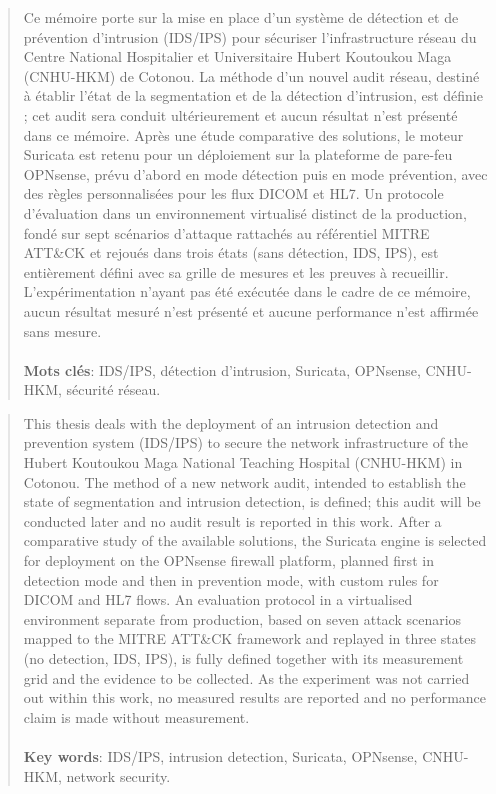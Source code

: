 \resume
{}
\vspace*{-6cm}
\begin{abstract}
Ce mémoire porte sur la mise en place d'un système de détection et de prévention d'intrusion (IDS/IPS) pour sécuriser l'infrastructure réseau du Centre National Hospitalier et Universitaire Hubert Koutoukou Maga (CNHU-HKM) de Cotonou. La méthode d'un nouvel audit réseau, destiné à établir l'état de la segmentation et de la détection d'intrusion, est définie ; cet audit sera conduit ultérieurement et aucun résultat n'est présenté dans ce mémoire. Après une étude comparative des solutions, le moteur Suricata est retenu pour un déploiement sur la plateforme de pare-feu OPNsense, prévu d'abord en mode détection puis en mode prévention, avec des règles personnalisées pour les flux DICOM et HL7. Un protocole d'évaluation dans un environnement virtualisé distinct de la production, fondé sur sept scénarios d'attaque rattachés au référentiel MITRE ATT\&CK et rejoués dans trois états (sans détection, IDS, IPS), est entièrement défini avec sa grille de mesures et les preuves à recueillir. L'expérimentation n'ayant pas été exécutée dans le cadre de ce mémoire, aucun résultat mesuré n'est présenté et aucune performance n'est affirmée sans mesure.

\paragraph{}
\textbf{Mots clés}: IDS/IPS, détection d'intrusion, Suricata, OPNsense, CNHU-HKM, sécurité réseau.
\end{abstract}

\newpage
\thispagestyle{empty}
\begin{abstract}

This thesis deals with the deployment of an intrusion detection and prevention system (IDS/IPS) to secure the network infrastructure of the Hubert Koutoukou Maga National Teaching Hospital (CNHU-HKM) in Cotonou. The method of a new network audit, intended to establish the state of segmentation and intrusion detection, is defined; this audit will be conducted later and no audit result is reported in this work. After a comparative study of the available solutions, the Suricata engine is selected for deployment on the OPNsense firewall platform, planned first in detection mode and then in prevention mode, with custom rules for DICOM and HL7 flows. An evaluation protocol in a virtualised environment separate from production, based on seven attack scenarios mapped to the MITRE ATT\&CK framework and replayed in three states (no detection, IDS, IPS), is fully defined together with its measurement grid and the evidence to be collected. As the experiment was not carried out within this work, no measured results are reported and no performance claim is made without measurement.

\paragraph{}
\textbf{Key words}: IDS/IPS, intrusion detection, Suricata, OPNsense, CNHU-HKM, network security.
\end{abstract}

